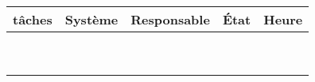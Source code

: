 \Large\begin{tabularx}{\linewidth}{
    |>{\hsize=3.0\hsize}X|%
    >{\hsize=0.5\hsize}X|%
    >{\hsize=0.5\hsize}X|%
    >{\hsize=0.5\hsize}X|%
    >{\hsize=0.5\hsize}X|%
  }
    \hline
    tâches & Système & Responsable & État & Heure\\\hline
      &   &   &   &  \\\hline
      &   &   &   &  \\\hline
      &   &   &   &  \\\hline
      &   &   &   &  \\\hline
      &   &   &   &  \\\hline
      &   &   &   &  \\\hline
      &   &   &   &  \\\hline
      &   &   &   &  \\\hline
      &   &   &   &  \\\hline
  \end{tabularx}
     